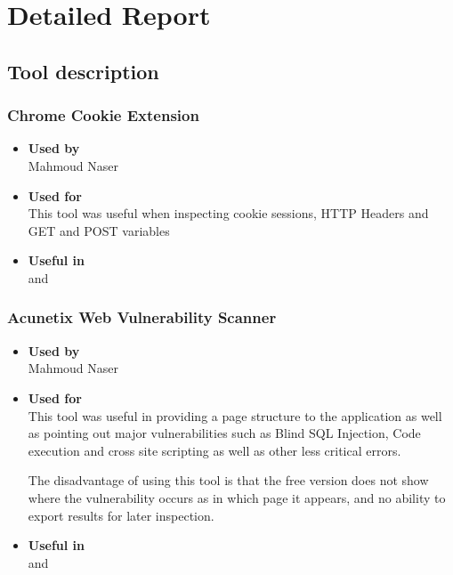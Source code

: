 \chapter{Detailed Report}\label{chapter:detailed_report}

\section{Tool description}
\subsection*{Chrome Cookie Extension}
\begin{itemize}
	\item \textbf{Used by}\\ Mahmoud Naser
	\item \textbf{Used for}\\ This tool was useful when inspecting cookie sessions, HTTP Headers and GET and POST variables
	\item \textbf{Useful in}\\  and 
\end{itemize}

\subsection*{Acunetix Web Vulnerability Scanner}
\begin{itemize}
	\item \textbf{Used by}\\ Mahmoud Naser
	\item \textbf{Used for}\\ This tool was useful in providing a page structure to the application as well as pointing out major vulnerabilities such as Blind SQL Injection, Code execution and cross site scripting as well as other less critical errors.
	
	The disadvantage of using this tool is that the free version does not show where the vulnerability occurs as in which page it appears, and no ability to export results for later inspection.
	\item \textbf{Useful in}\\  and 
\end{itemize}

